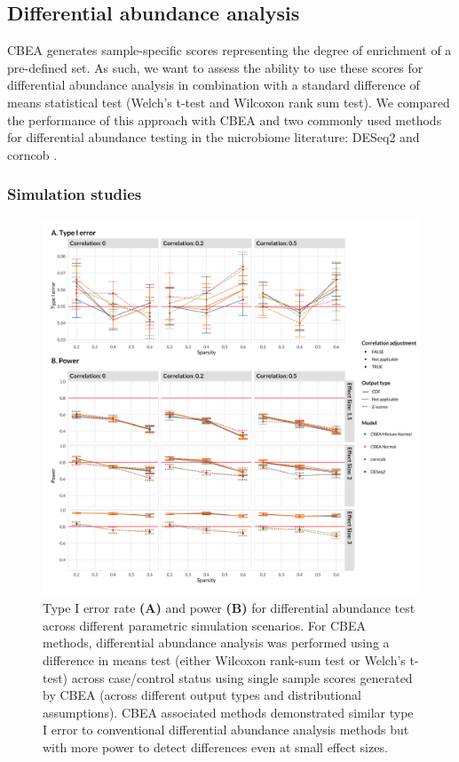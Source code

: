 \subsection*{Differential abundance analysis}
CBEA generates sample-specific scores representing the degree of enrichment of a pre-defined set. As such, we want to assess the ability to use these scores for differential abundance analysis in combination with a standard difference of means statistical test (Welch's t-test and Wilcoxon rank sum test). We compared the performance of this approach with CBEA and two commonly used methods for differential abundance testing in the microbiome literature: DESeq2 \cite{love2014} and corncob \cite{martin2020}.   

\subsubsection*{Simulation studies}
\begin{figure}[!h]
    \centering
    \includegraphics[width = \textwidth]{figures/sim_diff_ab_comb.png}
    \caption{Type I error rate \textbf{(A)} and power \textbf{(B)} for differential abundance test across different parametric simulation scenarios. For CBEA methods, differential abundance analysis was performed using a difference in means test (either Wilcoxon rank-sum test or Welch's t-test) across case/control status using single sample scores generated by CBEA (across different output types and distributional assumptions). CBEA associated methods demonstrated similar type I error to conventional differential abundance analysis methods but with more power to detect differences even at small effect sizes.} 
    \label{fig:4}
\end{figure}

